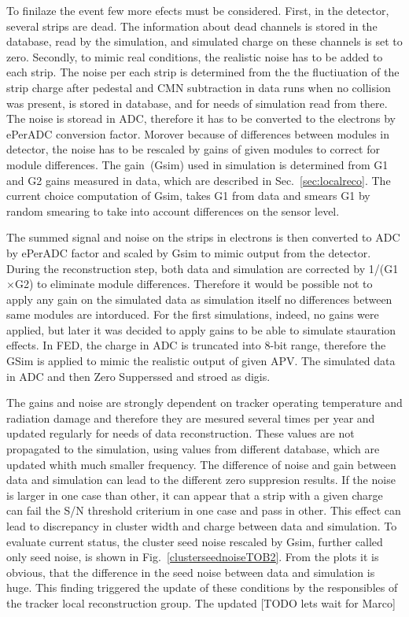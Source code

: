 To finilaze the event few more efects must be considered. First, in the detector, several strips are dead. The information about dead channels is stored in the database, read by the simulation, and simulated charge on these channels is set to zero. Secondly, to mimic real conditions, the realistic noise has to be added to each strip. The noise per each strip is determined from the the fluctiuation of the strip charge after pedestal and CMN subtraction in data runs when no collision was present, is stored in database, and for needs of simulation read from there. The noise is storead in ADC, therefore it has to be converted to the electrons by ePerADC conversion factor. Morover because of differences between modules in detector, the noise has to be rescaled by gains of given modules to correct for module differences. The gain~(Gsim) used in simulation is determined from G1 and G2 gains measured in data, which are described in Sec.~\ref{sec:localreco}. The current choice computation of Gsim, takes G1 from data and smears G1 by random smearing to take into account differences on the sensor level.

 The summed signal and noise on the strips in electrons is then converted to ADC by ePerADC factor and scaled by Gsim to mimic output from the detector. During the reconstruction step, both data and simulation are corrected by 1/(G1$\times$G2) to eliminate module differences. Therefore it would be possible not to apply any gain on the simulated data as simulation itself no differences between same modules are intorduced. For the first simulations, indeed, no gains were applied, but later it was decided to apply gains to be able to simulate stauration effects. In FED, the charge in ADC is truncated into 8-bit range, therefore the GSim is applied to mimic the realistic output of given APV. The simulated data in ADC and then Zero Supperssed and stroed as digis.
 

The gains and noise are strongly dependent on tracker operating temperature and radiation damage and therefore they are mesured several times per year and updated regularly for needs of data reconstruction. These values are not propagated to the simulation, using values from different database, which are updated whith much smaller frequency. The difference of noise and gain between data and simulation can lead to the different zero suppresion results. If the noise is larger in one case than other, it can appear that a strip with a given charge can fail the S/N threshold criterium in one case and pass in other. This effect can lead to discrepancy in cluster width and charge between data and simulation. To evaluate current status, the cluster seed noise rescaled by Gsim, further called only seed noise, is shown in Fig.~\ref{clusterseednoiseTOB2}. From the plots it is obvious, that the difference in the seed noise between data and simulation is huge. This finding triggered the update of these conditions by the responsibles of the tracker local reconstruction group. The updated [TODO lets wait for Marco] 

